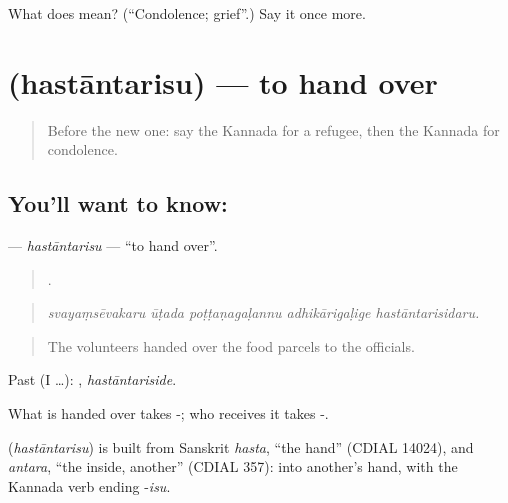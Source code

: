 \begin{tcolorbox}[breakable,colback=teal!4,colframe=teal!35!black,title={Before you move on}]
What does  mean? (\textquotedblleft{}Condolence; grief\textquotedblright{}.) Say it once more.
\end{tcolorbox}
\section[\texorpdfstring{\kn{ಹಸ್ತಾಂತರಿಸು} (hastāntarisu)}{ಹಸ್ತಾಂತರಿಸು (hastāntarisu)}]{ (hastāntarisu) — to hand over}

\label{lesson:KA-C375-hastantarisu}



\begin{quote}
Before the new one: say the Kannada for a refugee, then the Kannada for condolence.
\end{quote}

\subsection*{You'll want to know: }
\textbf{} — \emph{hastāntarisu} — \textquotedblleft{}to hand over\textquotedblright{}.

\begin{quote}
    .
\end{quote}

\begin{quote}
\emph{svayaṃsēvakaru ūṭada poṭṭaṇagaḷannu adhikārigaḷige hastāntarisidaru.}
\end{quote}

\begin{quote}
The volunteers handed over the food parcels to the officials.
\end{quote}

Past (I …): , \emph{hastāntariside}.

What is handed over takes -; who receives it takes -.

\begin{cousinweb}
\textbf{} (\emph{hastāntarisu}) is built from Sanskrit \emph{hasta}, \textquotedblleft{}the hand\textquotedblright{} (CDIAL 14024), and \emph{antara}, \textquotedblleft{}the inside, another\textquotedblright{} (CDIAL 357): into another's hand, with the Kannada verb ending -\emph{isu}.
\end{cousinweb}


